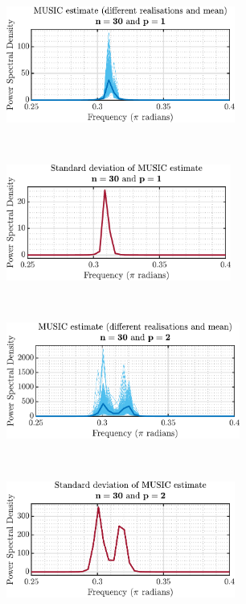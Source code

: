 \begin{enumerate}[label=\alph*), leftmargin=*]
\begin{figure}[h]
    \centering
    \centering
    \begin{subfigure}{0.49\textwidth}
        \centering
        \includegraphics[height=1.5in]{report/parametric-and-line-spectra/correlation-estimation/assets/e/MUSIC_mean-p_1}
    \end{subfigure}
    ~
    \begin{subfigure}{0.49\textwidth}
        \centering
        \includegraphics[height=1.5in]{report/parametric-and-line-spectra/correlation-estimation/assets/e/MUSIC_std-p_1}
    \end{subfigure}
    ~
    ~
    \begin{subfigure}{0.49\textwidth}
        \centering
        \includegraphics[height=1.5in]{report/parametric-and-line-spectra/correlation-estimation/assets/e/MUSIC_mean-p_2}
    \end{subfigure}
    ~ 
    \begin{subfigure}{0.49\textwidth}
        \centering
        \includegraphics[height=1.5in]{report/parametric-and-line-spectra/correlation-estimation/assets/e/MUSIC_std-p_2}

\end{subfigure}
\end{figure}
\end{enumerate}
